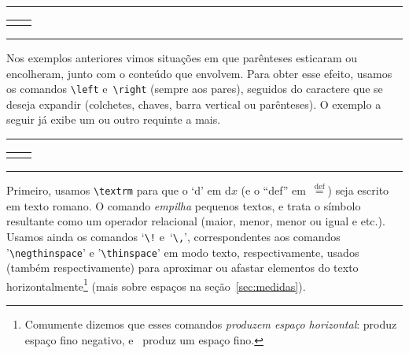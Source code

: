 \medskip
\begin{center}\hrule\smallskip
\begin{tabular}{c|c}
\begin{minipage}{.405\textwidth}\footnotesize

\end{minipage} &
\begin{minipage}{.535\textwidth}\setlength{\parindent}{1pc}

\end{minipage}
\end{tabular}
\smallskip\hrule
\end{center}
\medskip

Nos exemplos anteriores vimos situações em que parênteses esticaram ou
encolheram, junto com o conteúdo que envolvem. Para obter esse efeito,
usamos os comandos \verb'\left' e~\verb'\right' (sempre aos pares),
seguidos do caractere que se deseja expandir (colchetes, chaves, barra
vertical ou parênteses). O exemplo a seguir já exibe um ou outro
requinte a mais. 

\medskip
\begin{center}\hrule\smallskip
\begin{tabular}{c|c}
\begin{minipage}{.405\textwidth}\footnotesize

\end{minipage} &
\begin{minipage}{.535\textwidth}\setlength{\parindent}{1pc}

\end{minipage}
\end{tabular}
\smallskip\hrule
\end{center}
\medskip

Primeiro, usamos \verb'\textrm' para que o `d' em d$x$ (e o ``def''
em~$\stackrel{\textrm{def}}=$) seja escrito 
em texto romano. O comando  \emph{empilha}
pequenos textos, e trata o símbolo resultante como um operador
relacional (maior, menor, menor ou igual e etc.). Usamos ainda os
comandos `\verb'\!' e~`\verb'\,'', correspondentes aos comandos
'\verb'\negthinspace'' e '\verb'\thinspace'' em modo texto,
respectivamente, usados (também respectivamente) para aproximar ou
afastar elementos do texto horizontalmente\footnote{Comumente dizemos
  que esses comandos   \emph{produzem espaço horizontal}:
   produz   espaço fino negativo,
  e~ produz um espaço fino.} (mais sobre espaços
na seção~\ref{sec:medidas}).

